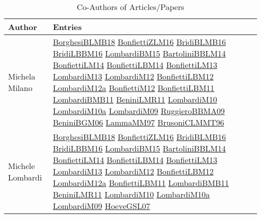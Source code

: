 {\scriptsize
\begin{longtable}{p{4cm}p{20cm}}
\caption{Co-Authors of Articles/Papers}\\ \toprule
Author & Entries \\ \midrule\endhead
\bottomrule
\endfoot
Michela Milano & \href{articles/BorghesiBLMB18.pdf}{BorghesiBLMB18}\cite{BorghesiBLMB18} \href{papers/BonfiettiZLM16.pdf}{BonfiettiZLM16}\cite{BonfiettiZLM16} \href{articles/BridiBLMB16.pdf}{BridiBLMB16}\cite{BridiBLMB16} \href{papers/BridiLBBM16.pdf}{BridiLBBM16}\cite{BridiLBBM16} \href{papers/LombardiBM15.pdf}{LombardiBM15}\cite{LombardiBM15} \href{papers/BartoliniBBLM14.pdf}{BartoliniBBLM14}\cite{BartoliniBBLM14} \href{papers/BonfiettiLM14.pdf}{BonfiettiLM14}\cite{BonfiettiLM14} \href{articles/BonfiettiLBM14.pdf}{BonfiettiLBM14}\cite{BonfiettiLBM14} \href{papers/BonfiettiLM13.pdf}{BonfiettiLM13}\cite{BonfiettiLM13} \href{papers/LombardiM13.pdf}{LombardiM13}\cite{LombardiM13} \href{articles/LombardiM12.pdf}{LombardiM12}\cite{LombardiM12} \href{papers/BonfiettiLBM12.pdf}{BonfiettiLBM12}\cite{BonfiettiLBM12} \href{articles/LombardiM12a.pdf}{LombardiM12a}\cite{LombardiM12a} \href{papers/BonfiettiM12.pdf}{BonfiettiM12}\cite{BonfiettiM12} \href{papers/BonfiettiLBM11.pdf}{BonfiettiLBM11}\cite{BonfiettiLBM11} \href{papers/LombardiBMB11.pdf}{LombardiBMB11}\cite{LombardiBMB11} \href{articles/BeniniLMR11.pdf}{BeniniLMR11}\cite{BeniniLMR11} \href{papers/LombardiM10.pdf}{LombardiM10}\cite{LombardiM10} \href{articles/LombardiM10a.pdf}{LombardiM10a}\cite{LombardiM10a} \href{papers/LombardiM09.pdf}{LombardiM09}\cite{LombardiM09} \href{articles/RuggieroBBMA09.pdf}{RuggieroBBMA09}\cite{RuggieroBBMA09} \href{papers/BeniniBGM06.pdf}{BeniniBGM06}\cite{BeniniBGM06} \href{articles/LammaMM97.pdf}{LammaMM97}\cite{LammaMM97} \href{papers/BrusoniCLMMT96.pdf}{BrusoniCLMMT96}\cite{BrusoniCLMMT96} \\
Michele Lombardi & \href{articles/BorghesiBLMB18.pdf}{BorghesiBLMB18}\cite{BorghesiBLMB18} \href{papers/BonfiettiZLM16.pdf}{BonfiettiZLM16}\cite{BonfiettiZLM16} \href{articles/BridiBLMB16.pdf}{BridiBLMB16}\cite{BridiBLMB16} \href{papers/BridiLBBM16.pdf}{BridiLBBM16}\cite{BridiLBBM16} \href{papers/LombardiBM15.pdf}{LombardiBM15}\cite{LombardiBM15} \href{papers/BartoliniBBLM14.pdf}{BartoliniBBLM14}\cite{BartoliniBBLM14} \href{papers/BonfiettiLM14.pdf}{BonfiettiLM14}\cite{BonfiettiLM14} \href{articles/BonfiettiLBM14.pdf}{BonfiettiLBM14}\cite{BonfiettiLBM14} \href{papers/BonfiettiLM13.pdf}{BonfiettiLM13}\cite{BonfiettiLM13} \href{papers/LombardiM13.pdf}{LombardiM13}\cite{LombardiM13} \href{articles/LombardiM12.pdf}{LombardiM12}\cite{LombardiM12} \href{papers/BonfiettiLBM12.pdf}{BonfiettiLBM12}\cite{BonfiettiLBM12} \href{articles/LombardiM12a.pdf}{LombardiM12a}\cite{LombardiM12a} \href{papers/BonfiettiLBM11.pdf}{BonfiettiLBM11}\cite{BonfiettiLBM11} \href{papers/LombardiBMB11.pdf}{LombardiBMB11}\cite{LombardiBMB11} \href{articles/BeniniLMR11.pdf}{BeniniLMR11}\cite{BeniniLMR11} \href{papers/LombardiM10.pdf}{LombardiM10}\cite{LombardiM10} \href{articles/LombardiM10a.pdf}{LombardiM10a}\cite{LombardiM10a} \href{papers/LombardiM09.pdf}{LombardiM09}\cite{LombardiM09} \href{papers/HoeveGSL07.pdf}{HoeveGSL07}\cite{HoeveGSL07} \\

\end{longtable}}
